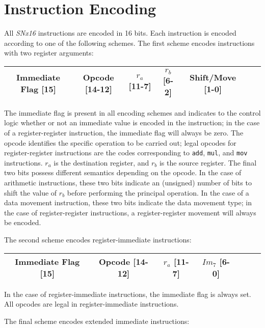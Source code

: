 \documentclass{article}
\begin{document}
\section{Instruction Encoding}

All \emph{SNx16} instructions are encoded in 16 bits. Each instruction is
encoded according to one of the following schemes. The first scheme encodes
instructions with two register arguments:

\begin{center}
\begin{tabular}{|c|c|c|c|c|c|c|}
\hline
Immediate Flag [15] & Opcode [14-12] & $r_{a}$ [11-7] & $r_{b}$ [6-2] & Shift/Move [1-0] \\ \hline
\end{tabular}
\end{center}

The immediate flag is present in all encoding schemes and indicates to the
control logic whether or not an immediate value is encoded in the instruction;
in the case of a register-register instruction, the immediate flag will always
be zero. The opcode identifies the specific operation to be carried out; legal
opcodes for register-register instructions are the codes corresponding to
\texttt{add}, \texttt{mul}, and \texttt{mov} instructions. $r_{a}$ is the
destination register, and $r_{b}$ is the source register. The final two bits
possess different semantics depending on the opcode. In the case of arithmetic
instructions, these two bits indicate an (unsigned) number of bits to shift the
value of $r_{b}$ before performing the principal operation. In the case of a
data movement instruction, these two bits indicate the data movement type; in
the case of register-register instructions, a register-register movement will
always be encoded.

The second scheme encodes register-immediate instructions:

\begin{center}
\begin{tabular}{|c|c|c|c|c|c|c|}
\hline
Immediate Flag [15] & Opcode [14-12] & $r_{a}$ [11-7] & $Im_{7}$ [6-0] \\ \hline
\end{tabular}
\end{center}

In the case of register-immediate instructions, the immediate flag is always
set. All opcodes are legal in register-immediate instructions.

The final scheme encodes extended immediate instructions:
\end{document}
